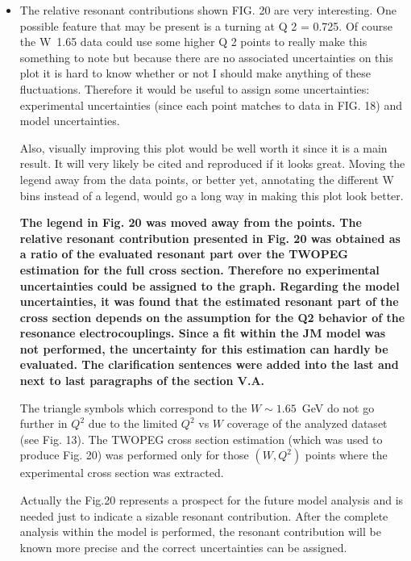 \documentclass[,superscriptaddress,showpacs,amssymb,amsmath,amsfonts,linenumbers,article]{revtex4-1}
\begin{document}
\begin{itemize}

\item The relative resonant contributions shown FIG. 20 are very interesting. One possible feature that
may be present is a turning at Q 2 = 0.725. Of course the W~1.65 data could use some higher Q 2
points to really make this something to note but because there are no associated uncertainties on
this plot it is hard to know whether or not I should make anything of these fluctuations. Therefore
it would be useful to assign some uncertainties: experimental uncertainties (since each point
matches to data in FIG. 18) and model uncertainties.

Also, visually improving this plot would be well worth it since it is a main result. It will very likely be
cited and reproduced if it looks great. Moving the legend away from the data points, or better yet,
annotating the different W bins instead of a legend, would go a long way in making this plot look
better.\\[0.5cm]
{\bf The legend in Fig. 20 was moved away from the points. The relative resonant contribution presented in Fig. 20 was obtained as a ratio of the evaluated resonant part over the TWOPEG estimation for the full cross section. Therefore no experimental uncertainties could be assigned to the graph. Regarding the model uncertainties, it was found that the estimated resonant part of the cross section depends on the assumption for the Q2 behavior of the resonance electrocouplings. Since a fit within the JM model was not performed, the uncertainty for this estimation can hardly be evaluated. The clarification sentences were added into the last and next to last paragraphs of the section V.A.

The triangle symbols which correspond to the $W \sim 1.65$~GeV do not go further in $Q^{2}$ due to the limited $Q^{2}$ vs $W$ coverage of the analyzed dataset (see Fig. 13). The TWOPEG cross section estimation (which was used to produce Fig. 20) was performed only for those $(W,Q^{2})$ points where the experimental cross section was extracted.

Actually the Fig.20 represents a prospect for the future model analysis and is needed just to indicate a sizable resonant contribution. After the complete analysis within the model is performed, the resonant contribution will be known more precise and the correct uncertainties can be assigned.}

\end{itemize}
\end{document}
